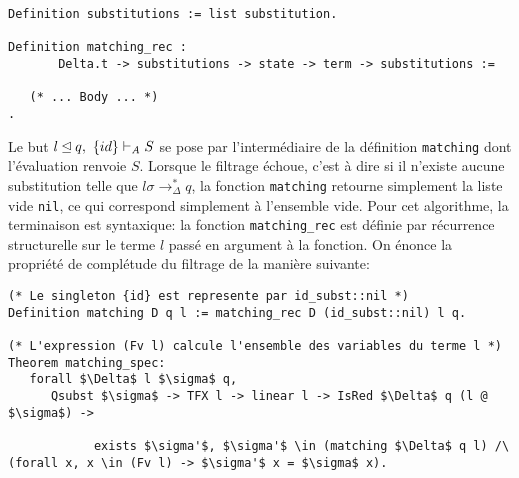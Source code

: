 \begin{lstlisting}
Definition substitutions := list substitution.

Definition matching_rec :
       Delta.t -> substitutions -> state -> term -> substitutions :=

   (* ... Body ... *)
.
\end{lstlisting}
Le but $l\unlhd q,\ \{id\} \vdash_\mathit A S$ se pose par l'intermédiaire de 
la définition \lstinline!matching! dont l'évaluation renvoie $S$.
Lorsque le filtrage échoue, c'est à dire si il n'existe aucune substitution
telle que $l\sigma \rightarrow_\Delta^* q$, la fonction \lstinline!matching! retourne
simplement la liste vide \lstinline!nil!, ce qui correspond simplement à l'ensemble vide.
Pour cet algorithme, la terminaison est syntaxique: la fonction \lstinline!matching_rec! est définie par récurrence 
structurelle sur le terme $l$ passé en argument à la fonction.
On énonce la propriété de complétude du filtrage de la manière suivante:
\begin{lstlisting}
(* Le singleton {id} est represente par id_subst::nil *)
Definition matching D q l := matching_rec D (id_subst::nil) l q.

(* L'expression (Fv l) calcule l'ensemble des variables du terme l *)
Theorem matching_spec:
   forall $\Delta$ l $\sigma$ q,
      Qsubst $\sigma$ -> TFX l -> linear l -> IsRed $\Delta$ q (l @ $\sigma$) ->

            exists $\sigma'$, $\sigma'$ \in (matching $\Delta$ q l) /\ (forall x, x \in (Fv l) -> $\sigma'$ x = $\sigma$ x).
\end{lstlisting}

